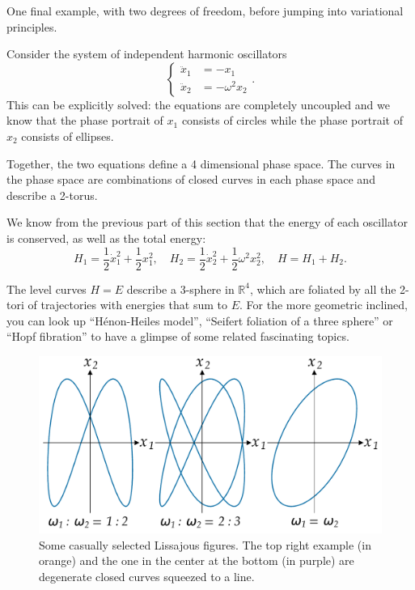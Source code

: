 \documentclass[english,fontsize=11pt,paper=a5,oneside]{scrbook}
\theoremstyle{definition}
\newenvironment{example}
  {\pushQED{\qed}\renewcommand{\qedsymbol}{$\lozenge$}\examplex}
  {\popQED\endexamplex}
\begin{document}
One final example, with two degrees of freedom, before jumping into variational principles.

\begin{example}[Lissajous Figures]\label{exa:lissajous}
  Consider the system of independent harmonic oscillators
  \begin{equation}
    \left\lbrace
    \begin{aligned}
      \ddot x_1 & = -x_1          \\
      \ddot x_2 & = -\omega^2 x_2
    \end{aligned}
    \right..
  \end{equation}
  This can be explicitly solved: the equations are completely uncoupled and we know that the phase portrait of $x_1$ consists of circles while the phase portrait of $x_2$ consists of ellipses.

  Together, the two equations define a 4 dimensional phase space. The curves in the phase space are combinations of closed curves in each phase space and describe a 2-torus.

  We know from the previous part of this section that the energy of each oscillator is conserved, as well as the total energy:
  \begin{equation}
    H_1 = \frac12\dot x_1^2 + \frac12 x_1^2, \quad
    H_2 = \frac12\dot x_2^2 + \frac12 \omega^2 x_2^2, \quad
    H = H_1 + H_2.
  \end{equation}

  The level curves $H=E$ describe a 3-sphere in $\mathbb{R}^4$, which are foliated by all the 2-tori of trajectories with energies that sum to $E$. For the more geometric inclined, you can look up ``H\'enon-Heiles model'', ``Seifert foliation of a three sphere'' or ``Hopf fibration'' to have a glimpse of some related fascinating topics.

  \begin{figure}[ht]
    \centering
    \includegraphics[width=.75\linewidth,trim={0 50pt 0 50pt},clip]{images/lissajous.pdf}
    \caption{Some casually selected Lissajous figures. The top right example (in orange) and the one in the center at the bottom (in purple) are degenerate closed curves squeezed to a line.}
    \label{img:lissajous}
  \end{figure}


\end{example}
\end{document}

